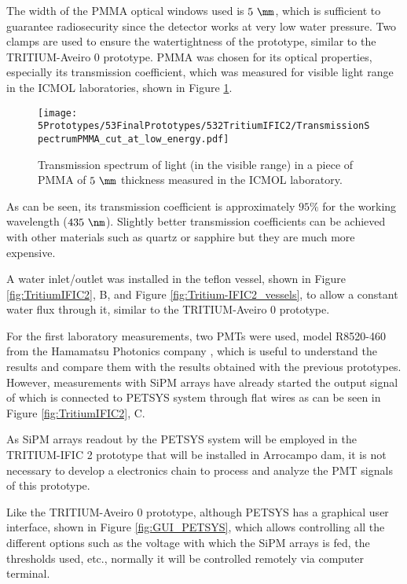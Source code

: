 The width of the PMMA optical windows used is $5~\mm$, which is sufficient to guarantee radiosecurity since the detector works at very low water pressure. Two clamps are used to ensure the watertightness of the prototype, similar to the TRITIUM-Aveiro 0 prototype. PMMA was chosen for its optical properties, especially its transmission coefficient, which was measured for visible light range in the ICMOL laboratories, shown in Figure \ref{fig:PMMATransmissionSpectrum}.

\begin{figure}[h]
\centering
\texttt{[image: 5Prototypes/53FinalPrototypes/532TritiumIFIC2/TransmissionSpectrumPMMA\_cut\_at\_low\_energy.pdf]}
\caption{Transmission spectrum of light (in the visible range) in a piece of PMMA of $5~\mm$ thickness measured in the ICMOL laboratory. \label{fig:PMMATransmissionSpectrum}}
\end{figure}	

As can be seen, its transmission coefficient is approximately $95\%$ for the working wavelength ($435~\nm$). Slightly better transmission coefficients can be achieved with other materials such as quartz or sapphire but they are much more expensive.

A water inlet/outlet was installed in the teflon vessel, shown in Figure \ref{fig:TritiumIFIC2}, B, and Figure \ref{fig:Tritium-IFIC2_vessels}, to allow a constant water flux through it, similar to the TRITIUM-Aveiro 0 prototype.

For the first laboratory measurements, two PMTs were used, model R8520-460 from the Hamamatsu Photonics company \cite{DataSheetPMTs}, which is useful to understand the results and compare them with the results obtained with the previous prototypes. However, measurements with SiPM arrays have already started the output signal of which is connected to PETSYS system through flat wires as can be seen in Figure \ref{fig:TritiumIFIC2}, C.

As SiPM arrays readout by the PETSYS system will be employed in the TRITIUM-IFIC 2 prototype that will be installed in Arrocampo dam, it is not necessary to develop a electronics chain to process and analyze the PMT signals of this prototype.

Like the TRITIUM-Aveiro 0 prototype, although PETSYS has a graphical user interface, shown in Figure \ref{fig:GUI_PETSYS}, which allows controlling all the different options such as the voltage with which the SiPM arrays is fed, the thresholds used, etc., normally it will be controlled remotely via computer terminal. 


